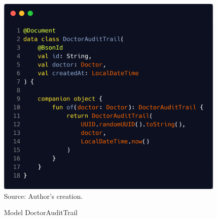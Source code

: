 \begin{figure}[HContext]
	\centering
	\caption{Model DoctorAuditTrail}
	\includegraphics[width=1\linewidthContext]{figures/doctor_audit_trail}
	\label{fig:doctoraudittrail}
	\footnotesize Source: Author's creation.
\end{figure}

